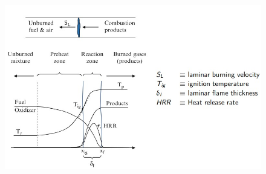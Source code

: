 \documentclass{article}
\begin{document}
\begin{figure}[h]
  \begin{center}
    \includegraphics[width=0.95\linewidth]{img/flame_graph.jpeg}
  \end{center}
\end{figure}
\end{document}
